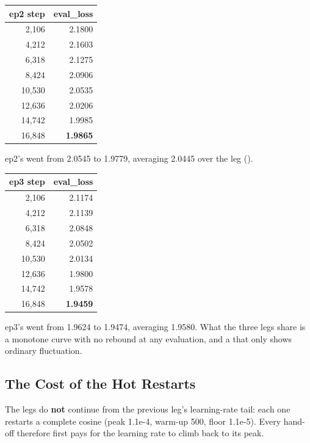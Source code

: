 \begin{center}\small
\begin{tabular}{@{}rr@{}}
\toprule
\textbf{ep2 step} & \textbf{eval\_loss} \\
\midrule
2{,}106 & 2.1800 \\
4{,}212 & 2.1603 \\
6{,}318 & 2.1275 \\
8{,}424 & 2.0906 \\
10{,}530 & 2.0535 \\
12{,}636 & 2.0206 \\
14{,}742 & 1.9985 \\
16{,}848 & \textbf{1.9865} \\
\bottomrule
\end{tabular}
\end{center}

ep2's  went from 2.0545 to 1.9779, averaging 2.0445 over the leg
().

\begin{center}\small
\begin{tabular}{@{}rr@{}}
\toprule
\textbf{ep3 step} & \textbf{eval\_loss} \\
\midrule
2{,}106 & 2.1174 \\
4{,}212 & 2.1139 \\
6{,}318 & 2.0848 \\
8{,}424 & 2.0502 \\
10{,}530 & 2.0134 \\
12{,}636 & 1.9800 \\
14{,}742 & 1.9578 \\
16{,}848 & \textbf{1.9459} \\
\bottomrule
\end{tabular}
\end{center}

ep3's  went from 1.9624 to 1.9474, averaging 1.9580. What the three legs share
is a monotone curve with no rebound at any evaluation, and a  that only shows
ordinary fluctuation.

\subsection{The Cost of the Hot Restarts}

The legs do \textbf{not} continue from the previous leg's learning-rate tail: each one restarts a
complete cosine (peak 1.1e-4, warm-up 500, floor 1.1e-5). Every hand-off therefore first pays for
the learning rate to climb back to its peak.

